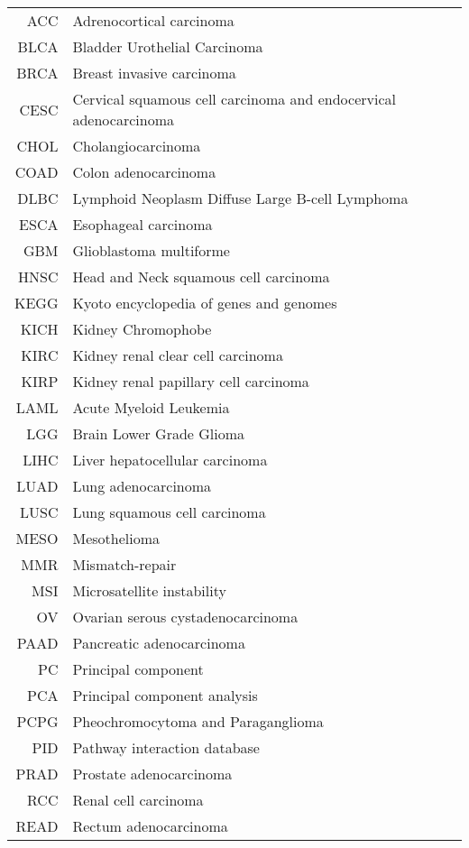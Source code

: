 \documentclass[
  parskip,
  oneside]{scrreprt}
\begin{document}
\begin{tabular}{rl}
        ACC & Adrenocortical carcinoma\\
        BLCA & Bladder Urothelial Carcinoma\\
        BRCA & Breast invasive carcinoma\\
        CESC & Cervical squamous cell carcinoma and endocervical adenocarcinoma\\
        CHOL & Cholangiocarcinoma\\
        COAD & Colon adenocarcinoma\\
      DLBC & Lymphoid Neoplasm Diffuse Large B-cell Lymphoma\\
      ESCA & Esophageal carcinoma\\
      GBM & Glioblastoma multiforme\\
      HNSC & Head and Neck squamous cell carcinoma\\
      KEGG & Kyoto encyclopedia of genes and genomes\\
      KICH & Kidney Chromophobe\\
      KIRC & Kidney renal clear cell carcinoma\\
      KIRP & Kidney renal papillary cell carcinoma\\
      LAML & Acute Myeloid Leukemia\\
      LGG    & Brain Lower Grade Glioma\\
      LIHC & Liver hepatocellular carcinoma\\
      LUAD & Lung adenocarcinoma\\
      LUSC & Lung squamous cell carcinoma\\
      MESO & Mesothelioma\\
      MMR & Mismatch-repair\\
      MSI & Microsatellite instability\\
      OV & Ovarian serous cystadenocarcinoma\\
      PAAD & Pancreatic adenocarcinoma\\
      PC & Principal component\\
      PCA & Principal component analysis\\
      PCPG & Pheochromocytoma and Paraganglioma\\
      PID & Pathway interaction database\\
      PRAD & Prostate adenocarcinoma\\
      RCC & Renal cell carcinoma\\
      READ & Rectum adenocarcinoma\\

\end{tabular}
\end{document}
